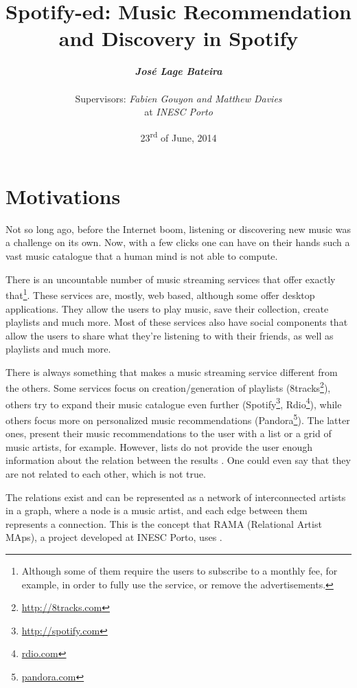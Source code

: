 \documentclass[twocolumn]{article}
\title{
  \huge
  \textbf{
    Spotify-ed: Music Recommendation and Discovery in Spotify
  }
}
\author{
  \large{\emph{\textbf{José Lage Bateira}}} \\ \\
  Supervisors: \emph{Fabien Gouyon and Matthew Davies}  \\
  at \emph{INESC Porto}
}
\date{23\textsuperscript{rd} of June, 2014}
\begin{document}
\maketitle

\thispagestyle{empty}

\section{Motivations}
\label{sec:motivations}

  Not so long ago, before the Internet boom, listening or discovering new music was a challenge on its own.
  Now, with a few clicks one can have on their hands such a vast music catalogue that a human mind is not able to compute.

  There is an uncountable number of music streaming services that offer exactly that\footnote{Although some of them require the users to subscribe to a monthly fee, for example, in order to fully use the service, or remove the advertisements.}.
  These services are, mostly, web based, although some offer desktop applications.
  They allow the users to play music, save their collection, create playlists and much more.
  Most of these services also have social components that allow the users to share what they're listening to with their friends, as well as playlists and much more.

  There is always something that makes a music streaming service different from the others.
  Some services focus on creation/generation of playlists (8tracks\footnote{\url{http://8tracks.com}}), others try to expand their music catalogue even further (Spotify\footnote{\url{http://spotify.com}}, Rdio\footnote{\url{rdio.com}}), while others focus more on personalized music recommendations (Pandora\footnote{\url{pandora.com}}).
  The latter ones, present their music recommendations to the user with a list or a grid of music artists, for example.
  However, lists do not provide the user enough information about the relation between the results \cite{Lamere2008}.
  One could even say that they are not related to each other, which is not true.
  
  The relations exist and can be represented as a network of interconnected artists in a graph, where a node is a music artist, and each edge between them represents a connection.
  This is the concept that RAMA (Relational Artist MAps), a project developed at INESC Porto, uses \cite{Costa2008} \cite{Sarmento2009} \cite{Costa2009} \cite{Gouyon2011}.
  
\end{document}
